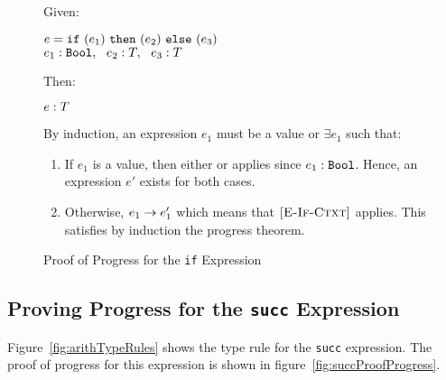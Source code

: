 \documentclass{report}
\newcommand{\rel}[1]{\mbox{\sc [#1]}}
\begin{document}
\begin{figure}[ht!]
Given:
\begin{center}
   $e = \mbox{\tt if}~({e_1})~\mbox{\tt then}~({e_2})~\mbox{\tt else}~({e_3})$\\
   ${e_1} : {\mbox{\tt Bool}},~~{e_2} : {T},~~{e_3} : {T}$
\end{center}
Then:
\begin{center}
   ${e} : {T}$
\end{center}
By induction, an expression $e_1$ must be a value or $\exists e_1$ such that:
\begin{enumerate}

    \item If $e_1$ is a value, then either \rel{E-If-True} or \rel{E-If-False} applies since ${e_1} : {\mbox{\tt Bool}}$.  Hence, an expression $e'$ exists for both cases.
      
    \item Otherwise, ${e_1} \rightarrow {e'_1}$ which means that $\rel{E-If-Ctxt}$ applies.  This satisfies by induction the progress theorem.
	
	\end{enumerate}
	
  \caption{Proof of Progress for the \texttt{if} Expression}\label{fig:ifProofProgress}
\end{figure}

\eject
\subsection{Proving Progress for the \texttt{succ} Expression}

Figure~\ref{fig:arithTypeRules} shows the type rule for the \texttt{succ} expression.  The proof of progress for this expression is shown in figure~\ref{fig:succProofProgress}.
\end{document}
